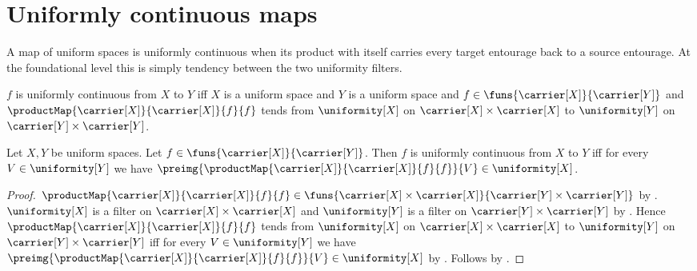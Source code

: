 \section{Uniformly continuous maps}





A map of uniform spaces is uniformly continuous when its product with itself
carries every target entourage back to a source entourage.  At the
foundational level this is simply tendency between the two uniformity
filters.

\begin{definition}\label{uniformly_continuous_map}
    $f$ is uniformly continuous from $X$ to $Y$ iff
        $X$ is a uniform space and
        $Y$ is a uniform space and
        $f\in\funs{\carrier[X]}{\carrier[Y]}$ and
        $\productMap{\carrier[X]}{\carrier[X]}{f}{f}$ tends from
            $\uniformity[X]$ on
            $\carrier[X]\times\carrier[X]$ to
            $\uniformity[Y]$ on
            $\carrier[Y]\times\carrier[Y]$.
\end{definition}

\begin{theorem}\label{uniformly_continuous_iff_entourages}
    Let $X,Y$ be uniform spaces.
    Let $f\in\funs{\carrier[X]}{\carrier[Y]}$.
    Then $f$ is uniformly continuous from $X$ to $Y$ iff
        for every $V\in\uniformity[Y]$ we have
        $\preimg{
            \productMap{\carrier[X]}{\carrier[X]}{f}{f}}{V}
            \in\uniformity[X]$.
\end{theorem}
\begin{proof}
    $\productMap{\carrier[X]}{\carrier[X]}{f}{f}\in\funs{
        \carrier[X]\times\carrier[X]}{
        \carrier[Y]\times\carrier[Y]}$ by .
    $\uniformity[X]$ is a filter on
        $\carrier[X]\times\carrier[X]$ and
        $\uniformity[Y]$ is a filter on
        $\carrier[Y]\times\carrier[Y]$ by .
    Hence $\productMap{\carrier[X]}{\carrier[X]}{f}{f}$ tends from
            $\uniformity[X]$ on
            $\carrier[X]\times\carrier[X]$ to
            $\uniformity[Y]$ on
            $\carrier[Y]\times\carrier[Y]$ iff
        for every $V\in\uniformity[Y]$ we have
            $\preimg{
                \productMap{\carrier[X]}{\carrier[X]}{f}{f}}{V}
                \in\uniformity[X]$ by
        .
    Follows by .
\end{proof}

